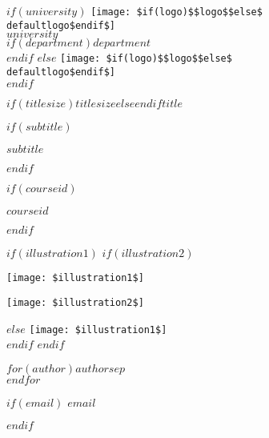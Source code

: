 \documentclass[12pt,a4paper]{article}
\def\defaultlogo{images/unige.pdf}
\begin{document}
\begin{titlepage}
    \centering

    $if(university)$
      \texttt{[image: \$if(logo)\$\$logo\$\$else\$\\defaultlogo\$endif\$]}\\[0.8cm]
      {\Large\textsc{$university$}}\\
      $if(department)${\large $department$}\\[1.2cm]$endif$
    $else$
      \texttt{[image: \$if(logo)\$\$logo\$\$else\$\\defaultlogo\$endif\$]}\\[2cm]
    $endif$

    {$if(titlesize)$$titlesize$$else$\Huge$endif$\bfseries\scshape $title$\par}

    $if(subtitle)$
      \vspace{0.6cm}
      {\Large $subtitle$\par}
    $endif$

    $if(courseid)$
      \vspace{0.3cm}
      {\large $courseid$\par}
    $endif$

    \vspace{1.2cm}

    $if(illustration1)$
      $if(illustration2)$
        \begin{minipage}{0.48\linewidth}
          \texttt{[image: \$illustration1\$]}
        \end{minipage}
        \hfill
        \begin{minipage}{0.48\linewidth}
          \texttt{[image: \$illustration2\$]}
        \end{minipage}
      $else$
        \texttt{[image: \$illustration1\$]}\\[1.2cm]
      $endif$
    $endif$

    {\Large $for(author)$$author$$sep$ \\ $endfor$\par}

    $if(email)$
      \vspace{0.3cm}
      \href{mailto:$email$}{\texttt{$email$}}\par
    $endif$


\end{titlepage}
\end{document}
